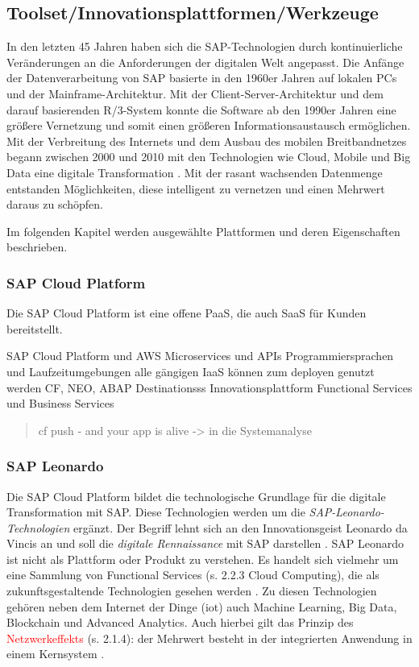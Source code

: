 \subsection{Toolset/Innovationsplattformen/Werkzeuge}
In den letzten 45 Jahren haben sich die SAP-Technologien durch kontinuierliche Veränderungen an die Anforderungen der digitalen Welt angepasst. Die Anfänge der Datenverarbeitung von SAP basierte in den 1960er Jahren auf lokalen PCs und der Mainframe-Architektur. Mit der Client-Server-Architektur und dem darauf basierenden R/3-System konnte die Software ab den 1990er Jahren eine größere Vernetzung und somit einen größeren Informationsaustausch ermöglichen. Mit der Verbreitung des Internets und dem Ausbau des mobilen Breitbandnetzes begann zwischen 2000 und 2010 mit den Technologien wie Cloud, Mobile und Big Data eine digitale Transformation \citep[S. 44]{Elsner2018}. Mit der rasant wachsenden Datenmenge entstanden Möglichkeiten, diese intelligent zu vernetzen und einen Mehrwert daraus zu schöpfen.

Im folgenden Kapitel werden ausgewählte Plattformen und deren Eigenschaften beschrieben.

\subsubsection{SAP Cloud Platform}

Die SAP Cloud Platform ist eine offene PaaS, die auch SaaS für Kunden bereitstellt.

SAP Cloud Platform und AWS Microservices und APIs
Programmiersprachen und Laufzeitumgebungen
alle gängigen IaaS können zum deployen genutzt werden
CF, NEO, ABAP
Destinationsss
Innovationsplattform
Functional Services und Business Services

\begin{quotation}
  cf push - and your app is alive -> in die Systemanalyse
\end{quotation}
\subsubsection{SAP Leonardo}

Die SAP Cloud Platform bildet die technologische Grundlage für die digitale Transformation mit SAP. Diese
Technologien werden um die \textit{SAP-Leonardo-Technologien} ergänzt. Der Begriff lehnt sich an den Innovationsgeist Leonardo da Vincis an und soll die \textit{digitale Rennaissance} mit SAP  darstellen \citep{Howells2017}.
SAP Leonardo ist nicht als Plattform oder Produkt zu verstehen. Es handelt sich vielmehr um eine Sammlung von Functional Services (s. 2.2.3 Cloud Computing), die als zukunftsgestaltende Technologien gesehen werden \citep{Elsner2018}. Zu diesen Technologien
gehören neben dem Internet der Dinge (\acf{iot}) auch Machine Learning, Big Data, Blockchain und Advanced Analytics.
Auch hierbei gilt das Prinzip des \textcolor{red}{Netzwerkeffekts} (s. 2.1.4): der Mehrwert besteht in der integrierten Anwendung in einem Kernsystem \citep{Elsner2018}.

